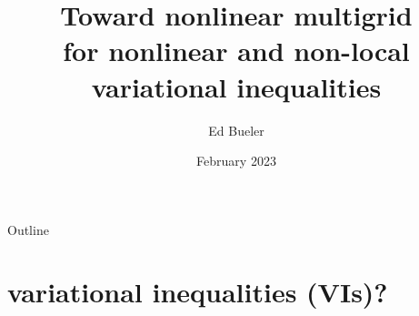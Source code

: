 \documentclass[svgnames,
               hyperref={colorlinks,citecolor=DeepPink4,linkcolor=FireBrick,urlcolor=Maroon},
               usepdftitle=false]  %
               {beamer}
\title[Multigrid for nonlinear VI]{Toward nonlinear multigrid \\ for nonlinear and non-local variational inequalities}
\author{Ed Bueler}
\institute[UAF]{University of Alaska Fairbanks}
\date[]{February 2023}
\begin{document}
\beamertemplatenavigationsymbolsempty


{
  \begin{frame}
    \titlepage
  \end{frame}
}

\begin{frame}{Outline}
  \tableofcontents[hideallsubsections]
\end{frame}


\section{variational inequalities (VIs)?}
\end{document}
